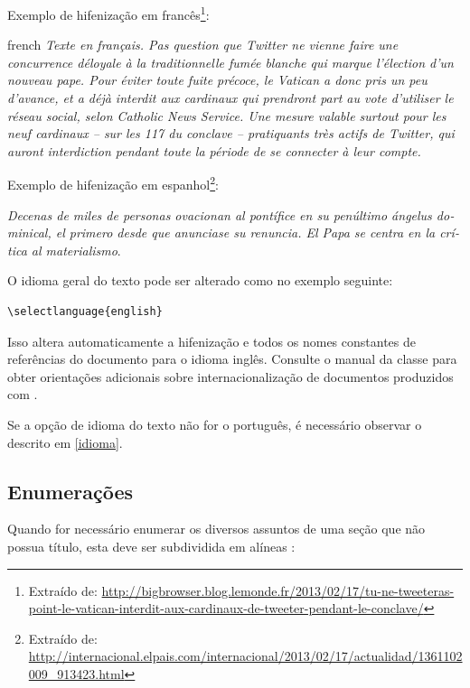 Exemplo de hifenização em francês\footnote{Extraído de:
	\url{http://bigbrowser.blog.lemonde.fr/2013/02/17/tu-ne-tweeteras-point-le-vatican-interdit-aux-cardinaux-de-tweeter-pendant-le-conclave/}}:

\begin{otherlanguage*}{french}
	\textit{Texte en français. Pas question que Twitter ne vienne faire une
		concurrence déloyale à la traditionnelle fumée blanche qui marque l'élection
		d'un nouveau pape. Pour éviter toute fuite précoce, le Vatican a donc pris un
		peu d'avance, et a déjà interdit aux cardinaux qui prendront part au vote
		d'utiliser le réseau social, selon Catholic News Service. Une mesure valable
		surtout pour les neuf cardinaux – sur les 117 du conclave – pratiquants très
		actifs de Twitter, qui auront interdiction pendant toute la période de se
		connecter à leur compte.}
\end{otherlanguage*}

Exemplo de hifenização em espanhol\footnote{Extraído de:
	\url{http://internacional.elpais.com/internacional/2013/02/17/actualidad/1361102009_913423.html}}:

\foreignlanguage{spanish}{\textit{Decenas de miles de personas ovacionan al pontífice en su
		penúltimo ángelus dominical, el primero desde que anunciase su renuncia. El Papa se
		centra en la crítica al materialismo}}.

O idioma geral do texto pode ser alterado como no exemplo seguinte:

\begin{verbatim}
\selectlanguage{english}

\end{verbatim}

Isso altera automaticamente a hifenização e todos os nomes constantes de
referências do documento para o idioma inglês. Consulte o manual da classe para obter orientações adicionais sobre internacionalização de documentos produzidos com \textsf{\abnTeX} \cite{abnetxclasse}.

Se a opção de idioma do texto não for o português, é necessário observar o descrito em \ref{idioma}.

\subsection{Enumerações}

Quando for necessário enumerar
os diversos assuntos de uma seção que não possua título, esta deve ser
subdividida em alíneas \cite{nbr6024}:

